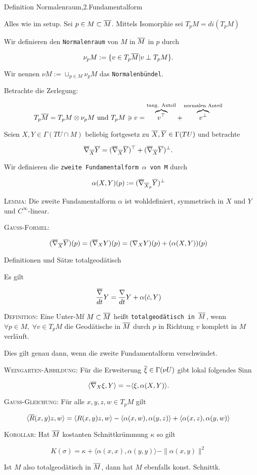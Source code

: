 \documentclass[a6paper,11pt,grid=front]{kartei}
\newcommand{\fl}[1]{\begin{flushleft}
 #1 \end{flushleft}}
\newcommand{\blf}[1]{\langle #1 \rangle}
\newcommand{\nabladt}[1][t]{\frac{\nabla}{d#1}}
\newcounter{def}
\begin{document}
\nonameyet
{\scriptsize Definition} {\scriptsize Normalenraum,2.Fundamentalform}
{
\scriptsize
\vspace{-2em}
Alles wie im setup. Sei $p\in M \subset \M$. 
Mittels Isomorphie sei $T_pM = di(T_pM)$ 
\fl{Wir definieren den \texttt{Normalenraum} von $M$ in $\M$ in $p$ durch}
\[
\nu_p M := \{ v\in T_p\M | v \perp T_pM \}.
\]
\fl{Wir nennen $\nu M := \sqcup_{p\in M} \nu_p M$ das \texttt{Normalenbündel}.}
\fl{Betrachte die Zerlegung:}
\vspace{-2em}
\[
T_p\M = T_p M \otimes \nu_p M 
\text{ und } T_pM \ni v = 
\overbrace{v^{\top}}^{\text{tang. Anteil}} 
+ \overbrace{v^{\perp}}^{\text{normalen Anteil}}
\]
\fl{Seien $X,Y \in \Gamma(TU\cap M)$ beliebig fortgesetz zu
$\M[X],\M[Y] \in \Gamma(TU)$ und betrachte }
\[
\M[\nabla]_{\M[X]} \M[Y] = (\M[\nabla]_{\M[X]} \M[Y])^\top +
(\M[\nabla]_{\M[X]} \M[Y])^\perp.
\]
\fl{Wir definieren die \texttt{zweite Fundamentalform $\alpha$ von M} durch}
\[
\alpha(X,Y)(p) := (\M[\nabla]_{\M[X]_p} \M[Y])^\perp
\]
\fl{\textsc{Lemma:} Die zweite Fundamentalform $\alpha$ ist wohldefiniert,
symmetrisch in $X$ und $Y$ und $C^\infty$-linear.}
\fl{\textsc{Gauß-Formel:}}
\vspace{-2em}
\[
(\M[\nabla]_{\M[X]} \M[Y])(p) = (\M[\nabla]_{X} Y)(p) 
= (\nabla_X Y)(p) + (\alpha(X,Y))(p)
\]
}
{}

\nonameyet
{\small Definitionen und Sätze} {\scriptsize totalgeodätisch}
{
\scriptsize
\fl{Es gilt}
\vspace{-2.5em}
\[
\frac{\M[\nabla]}{dt} Y = \nabladt Y + \alpha(\dot c, Y)
\]

\fl{\textsc{Definition:} Eine Unter-Mf $M \subset \M$ heißt
\texttt{totalgeodätisch in $\M$}, wenn 
$\forall p\in M, \;\forall v\in T_pM$
die Geodätische in $\M$ durch $p$ in Richtung $v$ komplett in $M$ 
verläuft. 
\par Dies gilt genau dann, wenn die zweite Fundamentalform verschwindet.}

\fl{\textsc{Weingarten-Abbildung:} Für die Erweiterung 
$\M[\xi] \in \Gamma(\nu U)$ gibt lokal folgendes Sinn}
\vspace{-1em}
\[
\blf{\M[\nabla]_X \xi, Y} = - \blf{\xi,\alpha(X,Y)}.
\]

\fl{\textsc{Gauß-Gleichung:} Für alle $x,y,z,w \in T_pM$ gilt}
\[
\blf{\M[R](x,y)z,w} = \blf{R(x,y)z,w} - \blf{\alpha(x,w),\alpha(y,z)}
+ \blf{\alpha(x,z),\alpha(y,w)}
\]

\fl{\textsc{Korollar}: Hat $\M$ kostanten Schnittkrümmung $\kappa$ so gilt}
\vspace{-1em}
\[
K(\sigma) = \kappa + \blf{\alpha(x,x),\alpha(y,y)} - \|\alpha(x,y)\|^2
\]
\fl{Ist $M$ also totalgeodätisch in $\M$, dann hat $M$ ebenfalls konst. 
Schnittk.}
}
{}
\end{document}
